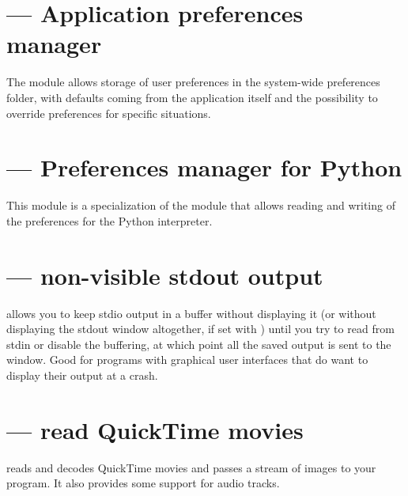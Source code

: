 {\section{ --- Application preferences manager}

The  module allows storage of user preferences in
the system-wide preferences folder, with defaults coming from the
application itself and the possibility to override preferences for
specific situations.


\section{ --- Preferences manager for Python}

This module is a specialization of the  module
that allows reading and writing of the preferences for the Python
interpreter.


\section{ --- non-visible stdout output}

 allows you to keep stdio output in a buffer
without displaying it (or without displaying the stdout window
altogether, if set with ) until you try to read from
stdin or disable the buffering, at which point all the saved output is
sent to the window.  Good for programs with graphical user interfaces
that do want to display their output at a crash.


\section{ --- read QuickTime movies}

 reads and decodes QuickTime movies and passes
a stream of images to your program. It also provides some support for
audio tracks.

}
